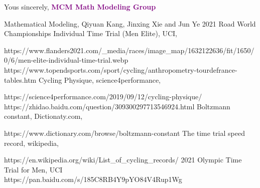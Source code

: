 \documentclass[12pt]{article}
\newcommand{\wholepages}{\pageref{LastPage}}
\theoremstyle{definition}
\theoremstyle{remark}
\numberwithin{equation}{section}
\begin{document}
	Yous sincerely,
	\textcolor{purple}{\textbf{MCM Math Modeling Group}}
	\newpage
	\renewcommand\refname{References}
	\begin{thebibliography}{100}
		 Mathematical Modeling, Qiyuan Kang, Jinxing Xie and Jun Ye
		2021 Road World Championships Individual Time Trial (Men Elite), UCI,
		
		https://www.flanders2021.com/\_media/races/image\_map/1632122636/fit/1650/0/6/men-elite-individual-time-trial.webp
		https://www.topendsports.com/sport/cycling/anthropometry-tourdefrance-tables.htm
		Cycling Physique, science4performance,
		
		https://science4performance.com/2019/09/12/cycling-physique/
		https://zhidao.baidu.com/question/309300297713546924.html
		Boltzmann constant, Dictionaty.com,
		
		https://www.dictionary.com/browse/boltzmann-constant
		The time trial speed record, wikipedia,

		https://en.wikipedia.org/wiki/List\_of\_cycling\_records/
		2021 Olympic Time Trial for Men, UCI\\
		https://pan.baidu.com/s/185C8RB4Y9pYO84V4Rup1Wg
	\end{thebibliography} 
\end{document}
